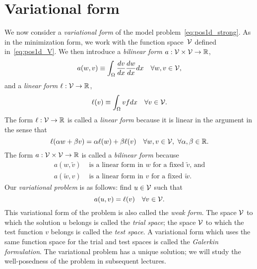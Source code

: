 \section{Variational form}
We now consider a \emph{variational form} of the model problem~\eqref{eq:pos1d_strong}. As in the minimization form, we work with the function space~$\mathcal{V}$ defined in~\eqref{eq:pos1d_V}. We then introduce a \emph{bilinear form} $a: \mathcal{V} \times \mathcal{V} \to \mathbb{R}$,
\begin{equation}
  a(w,v) \equiv \int_{\Omega} \frac{d v}{d x} \frac{d w}{d x} dx \quad \forall w, v \in \mathcal{V},
  \label{eq:pos1d_a}
\end{equation}
and a \emph{linear form} $\ell: \mathcal{V} \to \mathbb{R}$,
\begin{equation}
  \ell(v) \equiv \int_{\Omega} v f dx \quad \forall v \in \mathcal{V}.
  \label{eq:pos1d_ell}
\end{equation}
The form $\ell: \mathcal{V} \to \mathbb{R}$ is called a \emph{linear form} because it is linear in the argument in the sense that
\begin{equation*}
  \ell(\alpha w + \beta v) = \alpha \ell(w) + \beta \ell(v) \quad \forall w,v \in \mathcal{V}, \ \forall \alpha, \beta \in \mathbb{R}.
\end{equation*}
The form $a: \mathcal{V} \times \mathcal{V} \to \mathbb{R}$ is called a \emph{bilinear form} because 
\begin{align*}
  a(w, \tilde v) & \text{ is a linear form in $w$ for a fixed $\tilde v$, and} \\
  a(\tilde w, v) & \text{ is a linear form in $v$ for a fixed $\tilde w$}.
\end{align*}
Our \emph{variational problem} is as follows: find $u \in \mathcal{V}$ such that
\begin{equation}
  a(u,v) = \ell(v) \quad \forall v \in \mathcal{V}.
  \label{eq:pos1d_var}
\end{equation}
This variational form of the problem is also called the \emph{weak form}.  The space $\mathcal{V}$ to which the solution $u$ belongs is called the \emph{trial space}; the space $\mathcal{V}$ to which the test function $v$ belongs is called the \emph{test space}.  A variational form which uses the same function space for the trial and test spaces is called the \emph{Galerkin formulation}.  The variational problem has a unique solution; we will study the well-posedness of the problem in subsequent lectures.

